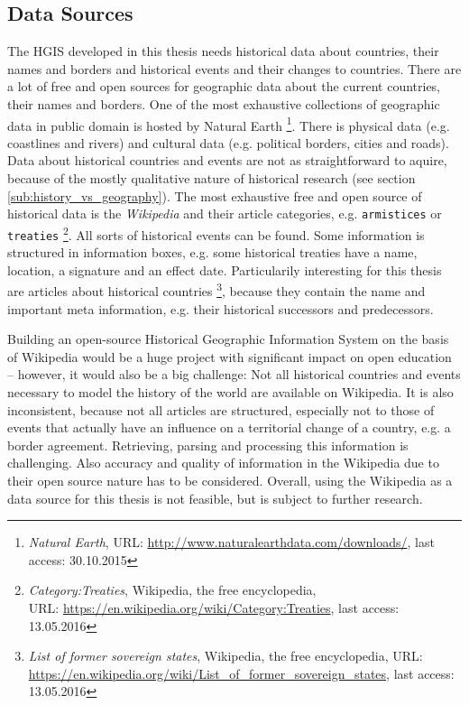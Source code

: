 \subsection{Data Sources} %
\label{sub:data_sources}

The HGIS developed in this thesis needs historical data about countries, their names and borders and historical events and their changes to countries. There are a lot of free and open sources for geographic data about the current countries, their names and borders. One of the most exhaustive collections of geographic data in public domain is hosted by Natural Earth
\footnote{
  \textit{Natural Earth},
  URL: \url{http://www.naturalearthdata.com/downloads/},
  last access: 30.10.2015
}.
There is physical data (e.g. coastlines and rivers) and cultural data (e.g. political borders, cities and roads).
Data about historical countries and events are not as straightforward to aquire, because of the mostly qualitative nature of historical research (see section \ref{sub:history_vs_geography}). The most exhaustive free and open source of historical data is the \emph{Wikipedia} and their article categories, e.g. \texttt{armistices} or \texttt{treaties}
\footnote{
  \textit{Category:Treaties},
  Wikipedia, the free encyclopedia,\\
  URL: \url{https://en.wikipedia.org/wiki/Category:Treaties},
  last access: 13.05.2016
}.
All sorts of historical events can be found. Some information is structured in information boxes, e.g. some historical treaties have a name, location, a signature and an effect date. Particularily interesting for this thesis are articles about historical countries
\footnote{
  \textit{List of former sovereign states},
  Wikipedia, the free encyclopedia,
  URL: \url{https://en.wikipedia.org/wiki/List_of_former_sovereign_states},
  last access: 13.05.2016
},
because they contain the name and important meta information, e.g. their historical successors and predecessors.

Building an open-source Historical Geographic Information System on the basis of Wikipedia would be a huge project with significant impact on open education -- however, it would also be a big challenge: Not all historical countries and events necessary to model the history of the world are available on Wikipedia. It is also inconsistent, because not all articles are structured, especially not to those of events that actually have an influence on a territorial change of a country, e.g. a border agreement. Retrieving, parsing and processing this information is challenging. Also accuracy and quality of information in the Wikipedia due to their open source nature has to be considered. Overall, using the Wikipedia as a data source for this thesis is not feasible, but is subject to further research.

